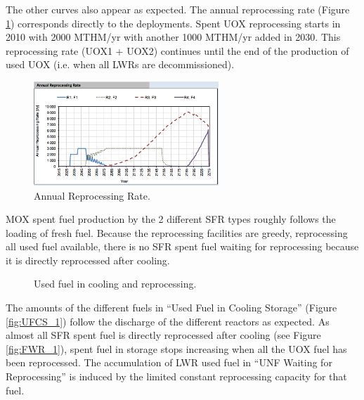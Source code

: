\documentclass[12pt]{article}
\begin{document}
The other curves also appear as expected. The annual reprocessing rate (Figure
\ref{fig:reprocessing_1}) corresponds directly to the deployments. Spent UOX
reprocessing starts in 2010 with 2000 MTHM/yr with another 1000 MTHM/yr added in
2030. This reprocessing rate (UOX1 + UOX2) continues until the end of the
production of used UOX (i.e. when all LWRs are decommissioned).

\begin{figure}[h!]
    \centering
    \includegraphics[width=0.62\textwidth]  {img/AnnualReprocessingRate_1}
    \caption{Annual Reprocessing Rate.}
    \label{fig:reprocessing_1}
\end{figure}


MOX spent fuel production by the 2 different SFR types roughly follows the
loading of fresh fuel.  Because the reprocessing facilities are greedy,
reprocessing all used fuel available, there is no SFR spent fuel waiting for reprocessing
because it is directly reprocessed after cooling.

\begin{figure}[h!]
    \centering
    \caption{Used fuel in cooling and reprocessing.\label{fig:cool_reprocc} }
\end{figure}

The amounts of the different fuels in ``Used Fuel in Cooling Storage'' (Figure
\ref{fig:UFCS_1}) follow the discharge of the different reactors as expected.
As almost all SFR spent fuel is directly reprocessed after cooling (see Figure
\ref{fig:FWR_1}), spent fuel in storage stops increasing when all the UOX fuel has
been reprocessed. 
The accumulation of LWR used fuel in ``UNF Waiting for
Reprocessing'' is induced by the limited constant reprocessing capacity for that
fuel. 
\end{document}
